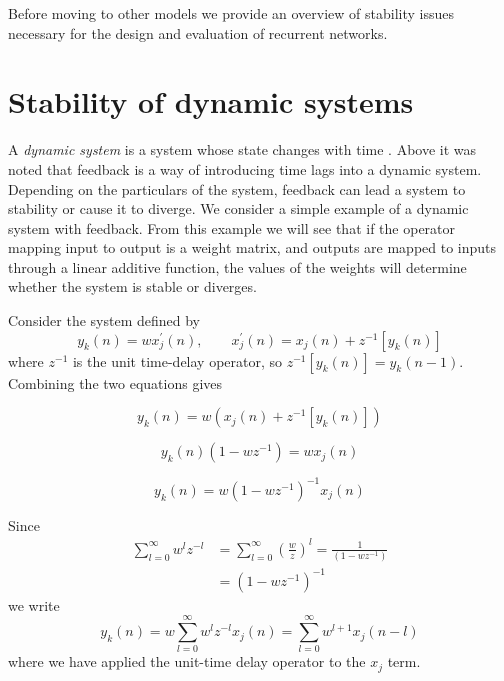 Before moving to other models we provide an overview of stability issues necessary for the design and evaluation of recurrent networks.

\section{Stability of dynamic systems}

A \emph{dynamic system} is a system whose state changes with time \cite[p. 675]{Haykin:2009:NNC:1213811}. Above it was noted that feedback is a way of introducing time lags into a dynamic system. Depending on the particulars of the system, feedback can lead a system to stability or cause it to diverge. We consider a simple example \cite[p. 18-21]{Haykin:2009:NNC:1213811} of a dynamic system with feedback. From this example we will see that if the operator mapping input to output is a weight matrix, and outputs are mapped to inputs through a linear additive function, the values of the weights will determine whether the system is stable or diverges.

Consider the system defined by
%
\begin{equation*}
y_k(n) = wx_j^\prime(n), \qquad x_j^\prime(n) = x_j(n) + z^{-1}[y_k(n)]
\end{equation*}
%
where $z^{-1}$ is the unit time-delay operator, so $z^{-1}[y_k(n)] = y_k(n-1)$. Combining the two equations gives

\begin{equation*}
  y_k(n) = w \left(x_j(n) + z^{-1}[y_k(n)]\right)
\end{equation*}

\begin{equation*}
  y_k(n)(1 - wz^{-1}) = wx_j(n)
\end{equation*}

\begin{equation*}
  y_k(n) = w(1 - wz^{-1})^{-1}x_j(n)
\end{equation*}

Since
%
\begin{align*}
  \sum_{l=0}^{\infty}w^l z^{-l} & = \sum_{l=0}^{\infty}\left(\frac{w}{z}\right)^l = \frac{1}{(1 - wz^{-1})} \\
  & = (1 - wz^{-1})^{-1}
\end{align*}
%
we write
%
\begin{equation*}
  y_k(n) = w \sum_{l=0}^{\infty}w^l z^{-l}x_j(n) = \sum_{l=0}^{\infty}w^{l+1}x_j(n - l)
\end{equation*}
%
where we have applied the unit-time delay operator to the $x_j$ term.

